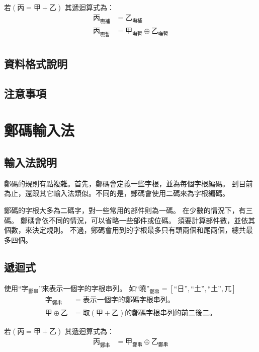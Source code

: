 \documentclass{article}
\begin{document}
若$(\mbox{丙}=\mbox{甲}+\mbox{乙})$
其遞迴算式為：
\begin{subequations}
  \begin{align}
  \mbox{丙}_{\mbox{嘸補}}&=\mbox{乙}_{\mbox{嘸補}}\\
  \mbox{丙}_{\mbox{嘸暫}}&=\mbox{甲}_{\mbox{嘸暫}} \oplus \mbox{乙}_{\mbox{嘸暫}}\\
  \end{align}
\end{subequations}

\subsection{資料格式說明}
\subsection{注意事項}

\section{鄭碼輸入法}
\subsection{輸入法說明}
鄭碼的規則有點複雜。首先，鄭碼會定義一些字根，並為每個字根編碼。
到目前為止，還跟其它輸入法類似。不同的是，鄭碼會使用二碼來為字根編碼。

鄭碼的字根大多為二碼字，對一些常用的部件則為一碼。
在少數的情況下，有三碼。
鄭碼會依不同的情況，可以省略一些部件或位碼。
須要計算部件數，並依其個數，來決定規則。
不過，鄭碼會用到的字根最多只有頭兩個和尾兩個，總共最多四個。

\subsection{遞迴式}
使用``$\mbox{字}_{\mbox{鄭串}}$''來表示一個字的字根串列。
如$\mbox{``曉''}_{\mbox{鄭串}}=[\mbox{``日''}, \mbox{``土''}, \mbox{``土''}, \mbox{兀}]$\\

\begin{subequations}
  \begin{align}
    \mbox{字}_{\mbox{鄭串}} &= 表示一個字的鄭碼字根串列。\\
    甲 \oplus 乙 &= 取(甲+乙)的鄭碼字根串列的前二後二。
  \end{align}
\end{subequations}

若$(\mbox{丙}=\mbox{甲}+\mbox{乙})$
其遞迴算式為：
\begin{subequations}
  \begin{align}
  \mbox{丙}_{\mbox{鄭串}} &= \mbox{甲}_{\mbox{鄭串}} \oplus \mbox{乙}_{\mbox{鄭串}} \\
  \end{align}
\end{subequations}
\end{document}
